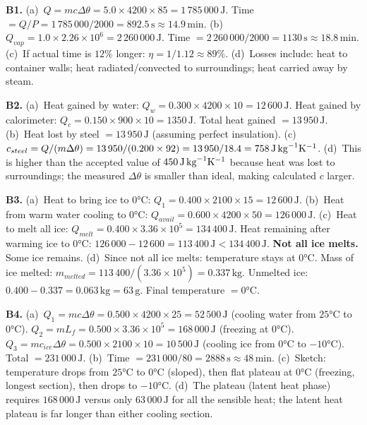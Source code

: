 \textbf{B1.}
(a)~$Q=mc\Delta\theta=5.0\times4200\times85
=1\,785\,000\,\text{J}$.
Time $=Q/P=1\,785\,000/2000=892.5\,\text{s}
\approx14.9\,\text{min}$. \quad
(b)~$Q_{vap}=1.0\times2.26\times10^6=2\,260\,000\,\text{J}$.
Time $=2\,260\,000/2000=1130\,\text{s}\approx18.8\,\text{min}$.
\quad
(c)~If actual time is $12\%$ longer:
$\eta=1/1.12\approx89\%$. \quad
(d)~Losses include: heat to container walls; heat
radiated/convected to surroundings; heat carried away
by steam.

\textbf{B2.}
(a)~Heat gained by water:
$Q_w=0.300\times4200\times10=12\,600\,\text{J}$.
Heat gained by calorimeter:
$Q_c=0.150\times900\times10=1350\,\text{J}$.
Total heat gained $=13\,950\,\text{J}$. \quad
(b)~Heat lost by steel $=13\,950\,\text{J}$ (assuming
perfect insulation). \quad
(c)~$c_{steel}=Q/(m\Delta\theta)
=13\,950/(0.200\times92)=13\,950/18.4
=758\,\text{J\,kg}^{-1}\text{K}^{-1}$. \quad
(d)~This is higher than the accepted value of
$450\,\text{J\,kg}^{-1}\text{K}^{-1}$ because heat
was lost to surroundings; the measured $\Delta\theta$
is smaller than ideal, making calculated $c$ larger.

\textbf{B3.}
(a)~Heat to bring ice to $0°\text{C}$:
$Q_1=0.400\times2100\times15=12\,600\,\text{J}$. \quad
(b)~Heat from warm water cooling to $0°\text{C}$:
$Q_{avail}=0.600\times4200\times50=126\,000\,\text{J}$.
\quad
(c)~Heat to melt all ice:
$Q_{melt}=0.400\times3.36\times10^5=134\,400\,\text{J}$.
Heat remaining after warming ice to $0°\text{C}$:
$126\,000-12\,600=113\,400\,\text{J}<134\,400\,\text{J}$.
\textbf{Not all ice melts.} Some ice remains. \quad
(d)~Since not all ice melts: temperature stays at
$0°\text{C}$.
Mass of ice melted:
$m_{melted}=113\,400/(3.36\times10^5)=0.337\,\text{kg}$.
Unmelted ice: $0.400-0.337=0.063\,\text{kg}=63\,\text{g}$.
Final temperature $=0°\text{C}$.

\textbf{B4.}
(a)~$Q_1=mc\Delta\theta=0.500\times4200\times25
=52\,500\,\text{J}$ (cooling water from $25°\text{C}$
to $0°\text{C}$).
$Q_2=mL_f=0.500\times3.36\times10^5=168\,000\,\text{J}$
(freezing at $0°\text{C}$).
$Q_3=mc_{ice}\Delta\theta=0.500\times2100\times10
=10\,500\,\text{J}$ (cooling ice from $0°\text{C}$
to $-10°\text{C}$).
Total $=231\,000\,\text{J}$. \quad
(b)~Time $=231\,000/80=2888\,\text{s}\approx48\,\text{min}$.
\quad
(c)~Sketch: temperature drops from $25°\text{C}$ to
$0°\text{C}$ (sloped), then flat plateau at $0°\text{C}$
(freezing, longest section), then drops to $-10°\text{C}$.
\quad
(d)~The plateau (latent heat phase) requires
$168\,000\,\text{J}$ versus only $63\,000\,\text{J}$
for all the sensible heat; the latent heat plateau
is far longer than either cooling section.

